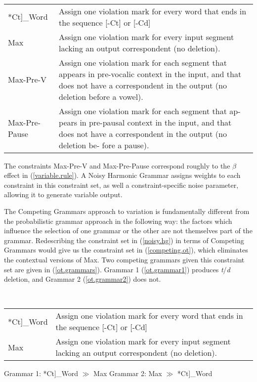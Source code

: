 \begin{exe}
	\ex \label{noisy.hg}\  \\
\begin{tabular}{lp{3in}}
	*{\sc Ct}]_{Word}& Assign one violation mark for every word that ends in the sequence [-Ct] or [-Cd]\\
	{\sc Max} & Assign one violation mark for every input segment lacking an output correspondent (no deletion).\\
	{\sc Max-Pre-V} & Assign one violation mark for each segment that appears in pre-vocalic context in the input, and that does not have a correspondent in the output (no deletion before a vowel).\\
	{\sc Max-Pre-Pause} &Assign one violation mark for each segment that ap- pears in pre-pausal context in the input, and that does not have a correspondent in the output (no deletion be- fore a pause).
\end{tabular}
\end{exe}
The constraints {\sc Max-Pre-V} and {\sc Max-Pre-Pause} correspond roughly to the $\beta$ effect in (\ref{variable.rule}). 
A Noisy Harmonic Grammar assigns weights to each constraint in this constraint set, as well a constraint-specific noise parameter, allowing it to generate variable output.

The Competing Grammars approach to variation is fundamentally different from the probabilistic grammar approach in the following way: the factors which influence the selection of one grammar or the other are not themselves part of the grammar.
Redescribing the constraint set in (\ref{noisy.hg}) in terms of Competing Grammars would give us the constraint set in (\ref{competing.ot}), which eliminates the contextual versions of {\sc Max}.
Two competing grammars given this constraint set are given in (\ref{ot.grammars}).
Grammar 1 (\ref{ot.grammar1}) produces {\sl t}/{\sl d} deletion, and Grammar 2 (\ref{ot.grammar2}) does not.
\begin{exe}
	\ex \label{competing.ot}\ \\
	\begin{tabular}{lp{3in}}
	*{\sc Ct}]_{Word}& Assign one violation mark for every word that ends in the sequence [-Ct] or [-Cd]\\
	{\sc Max} & Assign one violation mark for every input segment lacking an output correspondent (no deletion).
	\end{tabular}
	\ex \label{ot.grammars}
		\begin{xlist}
			\ex Grammar 1: *{\sc Ct}]_{Word} $\gg$ {\sc Max} \label{ot.grammar1}
			\ex Grammar 2: {\sc Max} $\gg$ *{\sc Ct}]_{Word} \label{ot.grammar2}
		\end{xlist}
\end{exe}

